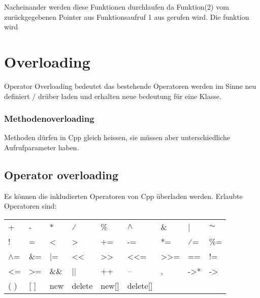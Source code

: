 Nacheinander werden diese Funktionen durchlaufen da Funktion(2) vom zurückgegebenen Pointer aus Funktionsaufruf 1 aus gerufen wird.
Die funktion wird 


\section{Overloading}

Operator Overloading bedeutet das bestehende Operatoren  werden im Sinne neu definiert / drüber laden und erhalten neue bedeutung für eine Klasse. 


\subsubsection{Methodenoverloading}

Methoden dürfen in Cpp gleich heissen, sie müssen aber unterschiedliche Aufrufparameter haben.



\subsection{Operator overloading}

Es können die inkludierten Operatoren von Cpp überladen werden. 
Erlaubte Operatoren sind:\\
\begin{tabular}{lllllllll}
    +            & -               & *           & ⁄                      & \%                           & $\wedge$                & \&                            & |                & $\sim$          \\
    !            & =               & \textless{} & \textgreater{}         & +=                           & -=                      & *=                            & ⁄=               & \%=             \\
    $\wedge$=    & \&=             & |=          & \textless{}\textless{} & \textgreater{}\textgreater{} & \textless{}\textless{}= & \textgreater{}\textgreater{}= & ==               & !=              \\
    \textless{}= & \textgreater{}= & \&\&        & ||                     & ++                           & --                      & ,                             & -\textgreater{}* & -\textgreater{} \\
    ( )          & {[} {]}         & new         & delete                 & new{[}{]}                    & delete{[}{]}            &                               &                  &                
\end{tabular}


